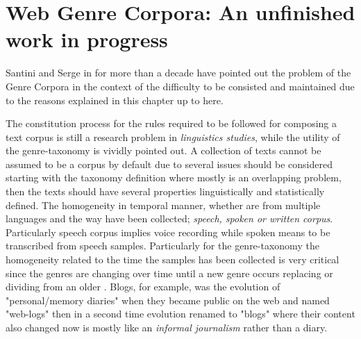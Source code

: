 \section{Web Genre Corpora: An unfinished work in progress}\label{chap:relevant_work:sec:intro}

Santini and Serge in \parencite{santini2009web} for more than a decade have pointed out the problem of the Genre Corpora in the context of the difficulty to be consisted and maintained due to the reasons explained in this chapter up to here. 

The constitution process for the rules required to be followed for composing a text corpus is still a research problem in \textit{linguistics studies}, while the utility of the genre-taxonomy is vividly pointed out. A collection of texts cannot be assumed to be a corpus by default due to several issues should be considered starting with the taxonomy definition where mostly is an overlapping problem, then the texts should have several properties linguistically and statistically defined. The homogeneity in temporal manner, whether are from multiple languages and the way have been collected; \textit{speech, spoken or written corpus}. Particularly speech corpus implies voice recording while spoken means to be transcribed from speech samples. Particularly for the genre-taxonomy the homogeneity related to the time the samples has been collected is very critical since the genres are changing over time until a new genre occurs replacing or dividing from an older \parencite{dash2018history}. Blogs, for example, was the evolution of "personal/memory diaries" when they became public on the web and named "web-logs" then in a second time evolution renamed to "blogs" where their content also changed now is mostly like an \textit{informal journalism} rather than a diary.

